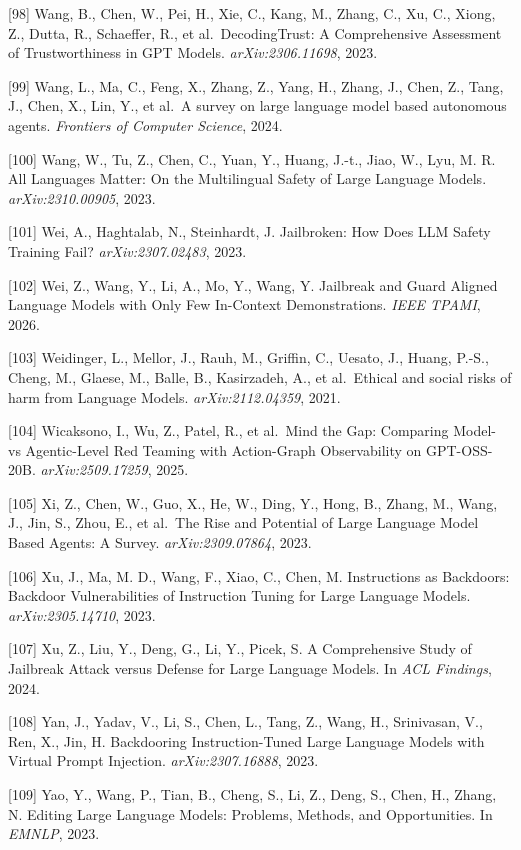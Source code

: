 {[}98{]} Wang, B., Chen, W., Pei, H., Xie, C., Kang, M., Zhang, C., Xu, C., Xiong, Z., Dutta, R., Schaeffer, R., et al.~DecodingTrust: A Comprehensive Assessment of Trustworthiness in GPT Models. \emph{arXiv:2306.11698}, 2023.

{[}99{]} Wang, L., Ma, C., Feng, X., Zhang, Z., Yang, H., Zhang, J., Chen, Z., Tang, J., Chen, X., Lin, Y., et al.~A survey on large language model based autonomous agents. \emph{Frontiers of Computer Science}, 2024.

{[}100{]} Wang, W., Tu, Z., Chen, C., Yuan, Y., Huang, J.-t., Jiao, W., Lyu, M. R. All Languages Matter: On the Multilingual Safety of Large Language Models. \emph{arXiv:2310.00905}, 2023.

{[}101{]} Wei, A., Haghtalab, N., Steinhardt, J. Jailbroken: How Does LLM Safety Training Fail? \emph{arXiv:2307.02483}, 2023.

{[}102{]} Wei, Z., Wang, Y., Li, A., Mo, Y., Wang, Y. Jailbreak and Guard Aligned Language Models with Only Few In-Context Demonstrations. \emph{IEEE TPAMI}, 2026.

{[}103{]} Weidinger, L., Mellor, J., Rauh, M., Griffin, C., Uesato, J., Huang, P.-S., Cheng, M., Glaese, M., Balle, B., Kasirzadeh, A., et al.~Ethical and social risks of harm from Language Models. \emph{arXiv:2112.04359}, 2021.

{[}104{]} Wicaksono, I., Wu, Z., Patel, R., et al.~Mind the Gap: Comparing Model- vs Agentic-Level Red Teaming with Action-Graph Observability on GPT-OSS-20B. \emph{arXiv:2509.17259}, 2025.

{[}105{]} Xi, Z., Chen, W., Guo, X., He, W., Ding, Y., Hong, B., Zhang, M., Wang, J., Jin, S., Zhou, E., et al.~The Rise and Potential of Large Language Model Based Agents: A Survey. \emph{arXiv:2309.07864}, 2023.

{[}106{]} Xu, J., Ma, M. D., Wang, F., Xiao, C., Chen, M. Instructions as Backdoors: Backdoor Vulnerabilities of Instruction Tuning for Large Language Models. \emph{arXiv:2305.14710}, 2023.

{[}107{]} Xu, Z., Liu, Y., Deng, G., Li, Y., Picek, S. A Comprehensive Study of Jailbreak Attack versus Defense for Large Language Models. In \emph{ACL Findings}, 2024.

{[}108{]} Yan, J., Yadav, V., Li, S., Chen, L., Tang, Z., Wang, H., Srinivasan, V., Ren, X., Jin, H. Backdooring Instruction-Tuned Large Language Models with Virtual Prompt Injection. \emph{arXiv:2307.16888}, 2023.

{[}109{]} Yao, Y., Wang, P., Tian, B., Cheng, S., Li, Z., Deng, S., Chen, H., Zhang, N. Editing Large Language Models: Problems, Methods, and Opportunities. In \emph{EMNLP}, 2023.

